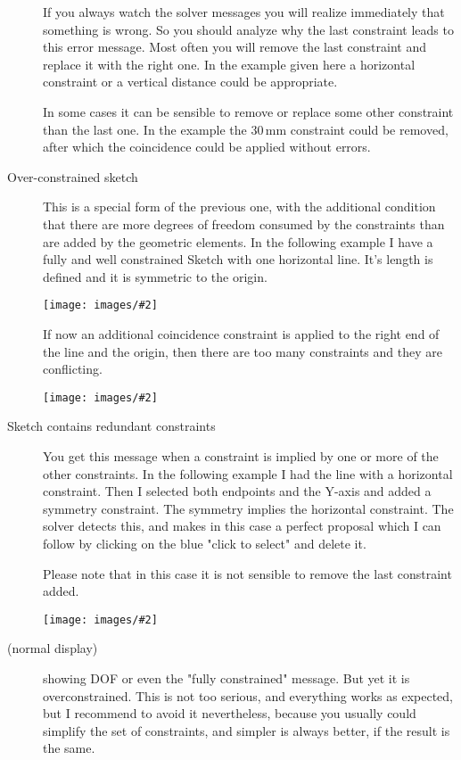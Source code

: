 \documentclass[12pt,titlepage]{article}
\newcommand{\icon}[1]{\raisebox{-1em}{\rule{0pt}{27pt}\texttt{[image: images/\#1]}}}
\newcommand{\img}[2]{\vspace{2ex}\noindent\texttt{[image: images/\#2]}}
\begin{document}
\begin{description}
      If you always watch the solver messages you will realize immediately that
      something is wrong. So you should analyze why the last constraint leads to this
      error message. Most often you will remove the last constraint and replace it
      with the right one. In the example given here a horizontal constraint
      \icon{Constraint_Horizontal} or a vertical distance
      \icon{Constraint_VerticalDistance} could be appropriate.

      In some cases it can be sensible to remove or replace some other constraint
      than the last one. In the example the 30\,mm constraint could be
      removed, after which the coincidence could be applied without errors.

\item [Over-constrained sketch] This is a special form of the previous one,
      with the additional condition that there are more degrees of freedom
      consumed by the constraints than are added by the geometric elements.
      In the following example I have a fully and well constrained Sketch with
      one horizontal line. It's length is defined and it is symmetric to the
      origin.

\img{}{ConstraintsSolverOver1}

      If now an additional coincidence constraint is applied to the right end
      of the line and the origin, then there are too many constraints and they
      are conflicting.

\img{}{ConstraintsSolverOver2}


\item [Sketch contains redundant constraints]You get this message when a
      constraint is implied by one or more of the other constraints. In the
      following example I had the line with a horizontal constraint. Then I selected
      both endpoints and the Y-axis and added a symmetry constraint. The symmetry
      implies the horizontal constraint. The solver detects this, and makes in this
      case a perfect proposal which I can follow by clicking on the blue "click to
      select" and delete it.
      
      Please note that in this case it is not sensible to remove the last constraint
      added.

\img{}{ConstraintsSolverRedundant}

\item [(normal display)] showing DOF or even the "fully constrained" message. But yet
      it is over\-con\-strained. This is not too serious, and everything works
      as expected, but I recommend to avoid it nevertheless, because you
      usually could simplify the set of constraints, and simpler is always
      better, if the result is the same.


\end{description}
\end{document}
